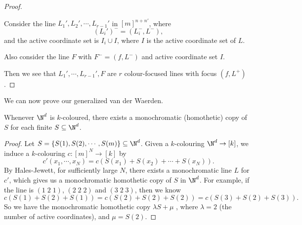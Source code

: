 \documentclass[a4paper]{article}
\begin{document}
\begin{proof}
\begin{center}
  \end{center}
  Consider the line $L_1', L_2', \cdots, L_{r - 1}'$ in $[m]^{n + n'}$, where
  \[
    (L_i')^- = (L_i^-, L^-),
  \]
  and the active coordinate set is $I_i \cup I$, where $I$ is the active coordinate set of $L$.

  Also consider the line $F$ with $F^- = (f, L^-)$ and active coordinate set $I$.

  Then we see that $L_1', \cdots, L_{r - 1}', F$ are $r$ colour-focused lines with focus $(f, L^+)$.
\end{proof}

We can now prove our generalized van der Waerden.
\begin{thm}[Gallai]
  Whenever $\N^d$ is $k$-coloured, there exists a monochromatic (homothetic) copy of $S$ for each finite $S \subseteq \N^d$.
\end{thm}

\begin{proof}
  Let $S = \{S(1), S(2), \cdots, S(m)\} \subseteq \N^d$. Given a $k$-colouring $\N^d \to [k]$, we induce a $k$-colouring $c: [m]^N \to [k]$ by
  \[
    c'(x_1, \cdots, x_N) = c(S(x_1) + S(x_2) + \cdots + S(x_N)).
  \]
  By Hales-Jewett, for sufficiently large $N$, there exists a monochromatic line $L$ for $c'$, which gives us a monochromatic homothetic copy of $S$ in $\N^d$. For example, if the line is $(1\; 2\; 1)$, $(2\; 2\; 2)$ and $(3\; 2\; 3)$, then we know
  \[
    c(S(1) + S(2) + S(1)) = c(S(2) + S(2) + S(2)) = c(S(3) + S(2) + S(3)).
  \]
  So we have the monochromatic homothetic copy $\lambda S + \mu$ , where $\lambda = 2$ (the number of active coordinates), and $\mu = S(2)$.
\end{proof}
\end{document}
